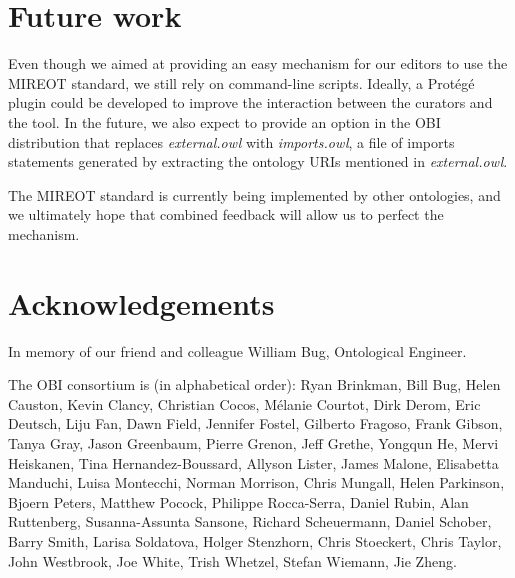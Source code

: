 \documentclass{elsart3p}    %
\begin{document}
\section*{Future work}
Even though we aimed at providing an easy mechanism for our editors to use the MIREOT standard, we still rely on command-line scripts.
Ideally, a Prot\'eg\'e\cite{RefWorks:1501} plugin could be developed to improve the interaction between the curators and the tool.
In the future, we also expect to provide an option in the OBI distribution that replaces \emph{external.owl} with \emph{imports.owl}, a file of imports statements generated by extracting the ontology URIs mentioned in \emph{external.owl}.

The MIREOT standard is currently being implemented by other ontologies, and we ultimately hope that combined feedback will allow us to perfect the mechanism.






\section*{Acknowledgements}

In memory of our friend and colleague William Bug, Ontological Engineer. 

The OBI consortium is (in alphabetical order): Ryan Brinkman, Bill Bug, Helen Causton, Kevin Clancy, Christian Cocos, M\'elanie Courtot, Dirk Derom, Eric Deutsch, Liju Fan, Dawn Field, Jennifer Fostel, Gilberto Fragoso, Frank Gibson, Tanya Gray, Jason Greenbaum, Pierre Grenon, Jeff Grethe, Yongqun He, Mervi Heiskanen, Tina Hernandez-Boussard, Allyson Lister, James Malone, Elisabetta Manduchi, Luisa Montecchi, Norman Morrison, Chris Mungall, Helen Parkinson, Bjoern Peters, Matthew Pocock, Philippe Rocca-Serra, Daniel Rubin, Alan Ruttenberg, Susanna-Assunta Sansone, Richard Scheuermann, Daniel Schober, Barry Smith, Larisa Soldatova, Holger Stenzhorn, Chris Stoeckert, Chris Taylor, John Westbrook,  Joe White, Trish Whetzel, Stefan Wiemann, Jie Zheng. 

   


\end{document}
